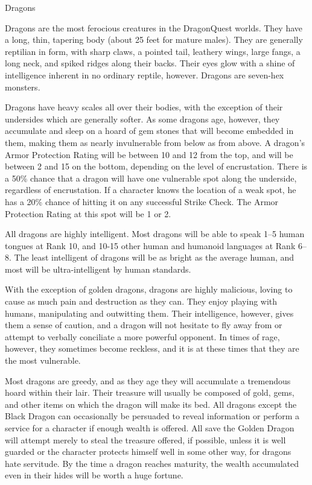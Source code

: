 \begin{mmgroup}{Dragons}

Dragons are the most ferocious creatures in the DragonQuest worlds.
They have a long, thin, tapering body (about 25 feet for mature
males).  They are generally reptilian in form, with sharp claws, a
pointed tail, leathery wings, large fangs, a long neck, and spiked
ridges along their backs. Their eyes glow with a shine of intelligence
inherent in no ordinary reptile, however.  Dragons are seven-hex
monsters.

Dragons have heavy scales all over their bodies, with the exception of
their undersides which are generally softer.  As some dragons age,
however, they accumulate and sleep on a hoard of gem stones that will
become embedded in them, making them as nearly invulnerable from below
as from above.  A dragon's Armor Protection Rating will be between 10
and 12 from the top, and will be between 2 and 15 on the bottom,
depending on the level of encrustation. There is a 50\% chance that a
dragon will have one vulnerable spot along the underside, regardless
of encrustation.  If a character knows the location of a weak spot, he
has a 20\% chance of hitting it on any successful Strike Check.  The
Armor Protection Rating at this spot will be 1 or 2.

All dragons are highly intelligent. Most dragons will be able to speak
1–5 human tongues at Rank 10, and 10-15 other human and humanoid
languages at Rank 6–8.  The least intelligent of dragons will be as
bright as the average human, and most will be ultra-intelligent by
human standards.

With the exception of golden dragons, dragons are highly malicious,
loving to cause as much pain and destruction as they can.  They enjoy
playing with humans, manipulating and outwitting them. Their
intelligence, however, gives them a sense of caution, and a dragon
will not hesitate to fly away from or attempt to verbally conciliate a
more powerful opponent.  In times of rage, however, they sometimes
become reckless, and it is at these times that they are the most
vulnerable.

Most dragons are greedy, and as they age they will accumulate a
tremendous hoard within their lair. Their treasure will usually be
composed of gold, gems, and other items on which the dragon will make
its bed. All dragons except the Black Dragon can occasionally be
persuaded to reveal information or perform a service for a character
if enough wealth is offered.  All save the Golden Dragon will attempt
merely to steal the treasure offered, if possible, unless it is well
guarded or the character protects himself well in some other way, for
dragons hate servitude.  By the time a dragon reaches maturity, the
wealth accumulated even in their hides will be worth a huge fortune.


\end{mmgroup}
